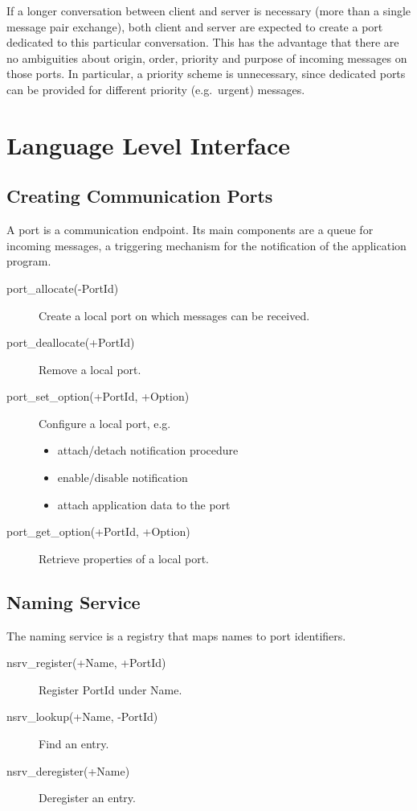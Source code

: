 If a longer conversation between client and server is necessary (more than
a single message pair exchange), both client and server are expected to
create a port dedicated to this particular conversation.
This has the advantage that there are no ambiguities about origin, order,
priority and purpose of incoming messages on those ports.
In particular, a priority scheme is unnecessary, since dedicated ports
can be provided for different priority (e.g.\ urgent) messages.


\section{Language Level Interface}

\subsection{Creating Communication Ports}
A port is a communication endpoint.
Its main components are a queue for incoming messages,
a triggering mechanism for the notification of the application program.
\begin{description}
\item [port\_allocate(-PortId)] Create a local port on which
messages can be received.
\item [port\_deallocate(+PortId)] Remove a local port.
\item [port\_set\_option(+PortId, +Option)] Configure a local port, e.g.\ 
\begin{itemize}
\item attach/detach notification procedure
\item enable/disable notification
\item attach application data to the port
\end{itemize}
\item [port\_get\_option(+PortId, +Option)]
Retrieve properties of a local port.
\end{description}

\subsection{Naming Service}
The naming service is a registry that maps names to port identifiers.
\begin{description}
\item [nsrv\_register(+Name, +PortId)] Register PortId under Name.
\item [nsrv\_lookup(+Name, -PortId)] Find an entry.
\item [nsrv\_deregister(+Name)] Deregister an entry.
\end{description}

